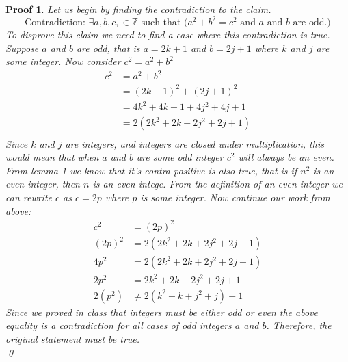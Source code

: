\documentclass[11pt]{article}
\newtheorem*{myproof}{Proof}
\begin{document}
\begin{myproof}
    Let us begin by finding the contradiction to the claim.
    $$ \text{Contradiction: }\exists a,b,c, \in \mathbb{Z} \text{ such that } (a^2+b^2=c^2 \text{ and } a \text{ and } b \text{ are odd.)}$$
    To disprove this claim we need to find a case where this contradiction is true. Suppose $a$ and $b$ are odd, that is $a = 2k+1$ and $b = 2j+1$ where $k$ and $j$ are some integer. Now consider $c^2 = a^2+b^2$
    \begin{align*}
        c^2 &= a^2+b^2 \\
        &= (2k+1)^2+(2j+1)^2 \\
        &= 4k^2+4k+1+4j^2+4j+1 \\
        &= 2(2k^2+2k+2j^2+2j+1) \\
    \end{align*}
    Since $k$ and $j$ are integers, and integers are closed under multiplication, this would mean that when $a$ and $b$ are some odd integer $c^2$ will always be an even. From lemma 1 we know that it's contra-positive is also true, that is if $n^2$ is an even integer, then $n$ is an even intege. From the definition of an even integer we can rewrite $c$ as $c = 2p$ where $p$ is some integer. Now continue our work from above:
    \begin{align*}
        c^2 &= (2p)^2 \\
        (2p)^2 &= 2(2k^2+2k+2j^2+2j+1) \\
        4p^2 &= 2(2k^2+2k+2j^2+2j+1) \\ 
        2p^2 &= 2k^2+2k+2j^2+2j+1 \\
        2(p^2) &\neq 2(k^2+k+j^2+j) + 1
    \end{align*}
    Since we proved in class that integers must be either odd or even the above equality is a contradiction for all cases of odd integers $a$ and $b$. Therefore, the original statement must be true.\\
    \qed
\end{myproof}
\newpage
\end{document}
